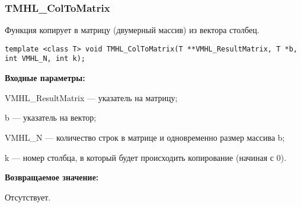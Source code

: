\documentclass[a4paper,12pt]{article}
\begin{document}
\subsubsection{TMHL\_ColToMatrix}\label{TMHL_ColToMatrix}

Функция копирует в матрицу (двумерный массив) из вектора столбец.


\begin{lstlisting}[label=code_syntax_TMHL_ColToMatrix,caption=Синтаксис]
template <class T> void TMHL_ColToMatrix(T **VMHL_ResultMatrix, T *b, int VMHL_N, int k);
\end{lstlisting}

\textbf{Входные параметры:}  
 
VMHL\_ResultMatrix --- указатель на матрицу;
 
b --- указатель на вектор;
 
VMHL\_N --- количество строк в матрице и одновременно размер массива b;
 
k --- номер столбца, в который будет происходить копирование (начиная с 0).

\textbf{Возвращаемое значение:}

Отсутствует.
\end{document}
